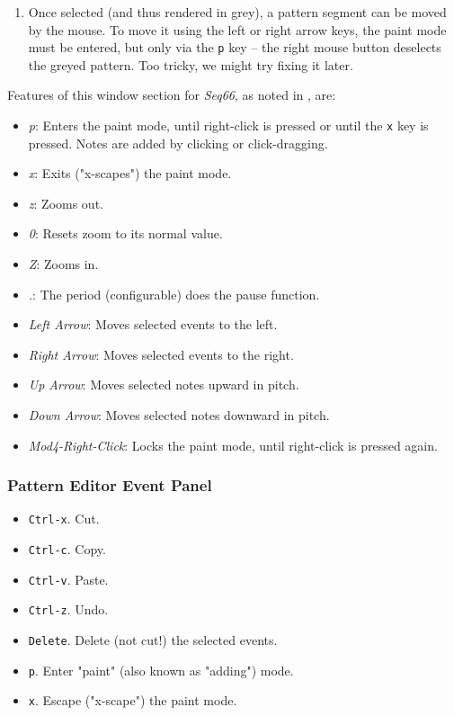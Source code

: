    \begin{enumerate}
      \item Once selected (and thus rendered in grey), a pattern segment
         can be moved by the mouse.  To move it using the left or right
         arrow keys, the paint mode must be entered, but only via the
         \texttt{p} key -- the right mouse button deselects the greyed pattern.
         Too tricky, we might try fixing it later.
   \end{enumerate}

   Features of this window section for \textsl{Seq66}, as noted in
   , are:

   \begin{itemize}
      \item \textsl{p}:  Enters the paint mode, until right-click is pressed or
         until the \texttt{x} key is pressed.  Notes are added
         by clicking or click-dragging.
      \item \textsl{x}:  Exits ("x-scapes") the paint mode.
      \item \textsl{z}:  Zooms out.
      \item \textsl{0}:  Resets zoom to its normal value.
      \item \textsl{Z}:  Zooms in.
      \item \textsl{.}:  The period (configurable) does the pause function.
      \item \textsl{Left Arrow}:  Moves selected events to the left.
      \item \textsl{Right Arrow}:  Moves selected events to the right.
      \item \textsl{Up Arrow}:  Moves selected notes upward in pitch.
      \item \textsl{Down Arrow}:  Moves selected notes downward in pitch.
      \item \textsl{Mod4-Right-Click}:  Locks the paint mode, until right-click
         is pressed again.
   \end{itemize}

\subsubsection{Pattern Editor Event Panel}
\label{subsubsec:kbd_mouse_pattern_editor_event_panel}

   \begin{itemize}
      \item \texttt{Ctrl-x}. Cut.
      \item \texttt{Ctrl-c}. Copy.
      \item \texttt{Ctrl-v}. Paste.
      \item \texttt{Ctrl-z}. Undo.
      \item \texttt{Delete}.  Delete (not cut!) the selected events.
      \item \texttt{p}.  Enter "paint" (also known as "adding") mode.
      \item \texttt{x}.  Escape ("x-scape") the paint mode.
   \end{itemize}

